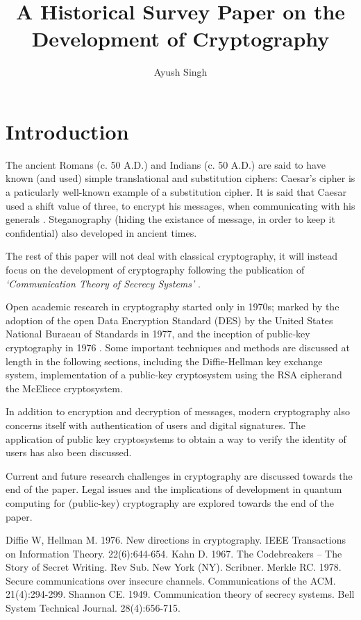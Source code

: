 \documentclass[a4paper,11pt]{article}
\author{Ayush Singh}
\title{A Historical Survey Paper on the Development of Cryptography}
\date{\vspace{-5ex}}
\begin{document}
\maketitle

\section{Introduction}

The ancient Romans (c. 50 A.D.) and Indians (c. 50 A.D.) are said to have known (and used) simple translational and substitution ciphers: Caesar's cipher is a paticularly well-known example of a substitution cipher. It is said that Caesar used a shift value of three, to encrypt his messages, when communicating with his generals \cite{kahn67}. 
Steganography (hiding the existance of message, in order to keep it confidential) also developed in ancient times. 

The rest of this paper will not deal with classical cryptography, it will  instead focus on the development of cryptography following the publication of \emph{`Communication Theory of Secrecy Systems'} \cite{shannon49}.

Open academic research in cryptography started only in 1970s; marked by the adoption of the open Data Encryption Standard (DES) by the United States National Buraeau of Standards in 1977, and the inception of public-key cryptography in 1976 \cite{dh76b} \cite{merkle78}. Some important techniques and methods are discussed at length in the following sections, including the Diffie-Hellman key exchange system, implementation of a public-key cryptosystem using the RSA cipherand the McEliece cryptosystem.

In addition to encryption and decryption of messages, modern cryptography also concerns itself with authentication of users and digital signatures. The application of public key cryptosystems to obtain a way to verify the identity of users has also been discussed.

Current and future research challenges in cryptography are discussed towards the end of the paper. Legal issues and the implications of development in quantum computing for (public-key) cryptography are explored towards the end of the paper.

\begin{thebibliography}{99}
		Diffie W, Hellman M. 1976. New directions in cryptography. IEEE Transactions on Information Theory. 22(6):644-654.
		Kahn D. 1967. The Codebreakers -- The Story of Secret Writing. Rev Sub. New York (NY). Scribner.
		Merkle RC. 1978. Secure communications over insecure channels. Communications of the ACM. 21(4):294-299.
		Shannon CE. 1949. Communication theory of secrecy systems. Bell System Technical Journal. 28(4):656-715.


\end{thebibliography}
\end{document}
